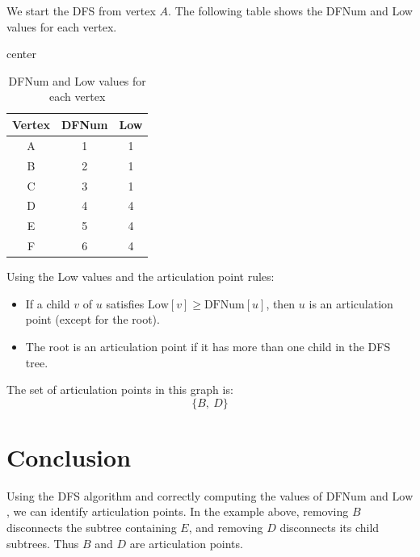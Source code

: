 \documentclass[a4paper,12pt]{article}
\newcommand{\EN}[1]{\text{#1}}
\begin{document}
	We start the DFS from vertex \(A\). The following table shows the DFNum and Low values for each vertex.
	
	\begin{table}[H]
		\centering
		\begin{adjustbox}{center}
			\begin{tabular}{|c|c|c|}
				\hline
				Vertex & DFNum & Low \\
				\hline
				A & 1 & 1 \\
				\hline
				B & 2 & 1 \\
				\hline
				C & 3 & 1 \\
				\hline
				D & 4 & 4 \\
				\hline
				E & 5 & 4 \\
				\hline
				F & 6 & 4 \\
				\hline
			\end{tabular}
		\end{adjustbox}
		\caption{DFNum and Low values for each vertex}
	\end{table}
	
	Using the Low values and the articulation point rules:
	\begin{itemize}
		\item If a child \(v\) of \(u\) satisfies \(\text{Low}[v] \ge \text{DFNum}[u]\), then \(u\) is an articulation point (except for the root).
		\item The root is an articulation point if it has more than one child in the DFS tree.
	\end{itemize}
	
	The set of articulation points in this graph is:
	\[
	\{B,\ D\}
	\]
	
	\section{Conclusion}
	
	Using the DFS algorithm and correctly computing the values of \(\EN{DFNum}\) and \(\EN{Low}\), we can identify articulation points. In the example above, removing \(B\) disconnects the subtree containing \(E\), and removing \(D\) disconnects its child subtrees. Thus \(B\) and \(D\) are articulation points.
	
\end{document}
